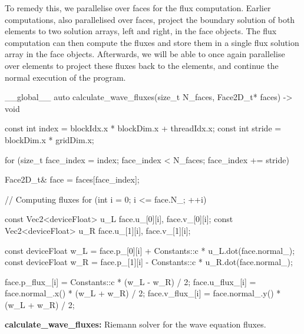 To remedy this, we parallelise over faces for the flux computation. Earlier computations, also
parallelised over faces, project the boundary solution of both elements to two solution arrays, left
and right, in the face objects. The flux computation can then compute the fluxes and store them in a
single flux solution array in the face objects. Afterwards, we will be able to once again
parallelise over elements to project these fluxes back to the elements, and continue the normal
execution of the program.

\begin{algorithm}[H]
    \begin{cuda}
        __global__
        auto calculate_wave_fluxes(size_t N_faces, Face2D_t* faces) -> void {
            const int index = blockIdx.x * blockDim.x + threadIdx.x;
            const int stride = blockDim.x * gridDim.x;

            for (size_t face_index = index; face_index < N_faces; face_index += stride) {
                Face2D_t& face = faces[face_index];

                // Computing fluxes
                for (int i = 0; i <= face.N_; ++i) {
                    const Vec2<deviceFloat> u_L {face.u_[0][i], face.v_[0][i]};
                    const Vec2<deviceFloat> u_R {face.u_[1][i], face.v_[1][i]};

                    const deviceFloat w_L = face.p_[0][i] + Constants::c * u_L.dot(face.normal_);
                    const deviceFloat w_R = face.p_[1][i] - Constants::c * u_R.dot(face.normal_);

                    face.p_flux_[i] = Constants::c * (w_L - w_R) / 2;
                    face.u_flux_[i] = face.normal_.x() * (w_L + w_R) / 2;
                    face.v_flux_[i] = face.normal_.y() * (w_L + w_R) / 2;
                }
            }
        }\end{cuda}
\caption{\textbf{calculate\_wave\_fluxes:} Riemann solver for the wave equation fluxes.}\label{alg:wave_fluxes}
\end{algorithm}
